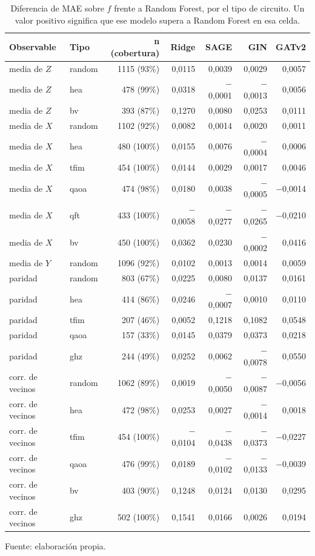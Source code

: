 \begin{table}[htbp]
    \centering
    {\footnotesize
    \begin{tabular}{@{}llrrrrr@{}}
        \toprule
        \textbf{Observable} & \textbf{Tipo} & \textbf{n (cobertura)} & \textbf{Ridge} & \textbf{SAGE} & \textbf{GIN} & \textbf{GATv2} \\
        \midrule
        media de $Z$ & random & 1115 (93\%) & 0,0115 & 0,0039 & 0,0029 & 0,0057 \\
        media de $Z$ & hea & 478 (99\%) & 0,0318 & $-$0,0001 & $-$0,0013 & 0,0056 \\
        media de $Z$ & bv & 393 (87\%) & 0,1270 & 0,0080 & 0,0253 & 0,0111 \\
        media de $X$ & random & 1102 (92\%) & 0,0082 & 0,0014 & 0,0020 & 0,0011 \\
        media de $X$ & hea & 480 (100\%) & 0,0155 & 0,0076 & $-$0,0004 & 0,0006 \\
        media de $X$ & tfim & 454 (100\%) & 0,0144 & 0,0029 & 0,0017 & 0,0046 \\
        media de $X$ & qaoa & 474 (98\%) & 0,0180 & 0,0038 & $-$0,0005 & $-$0,0014 \\
        media de $X$ & qft & 433 (100\%) & $-$0,0058 & $-$0,0277 & $-$0,0265 & $-$0,0210 \\
        media de $X$ & bv & 450 (100\%) & 0,0362 & 0,0230 & $-$0,0002 & 0,0416 \\
        media de $Y$ & random & 1096 (92\%) & 0,0102 & 0,0013 & 0,0014 & 0,0059 \\
        paridad & random & 803 (67\%) & 0,0225 & 0,0080 & 0,0137 & 0,0161 \\
        paridad & hea & 414 (86\%) & 0,0246 & $-$0,0007 & 0,0010 & 0,0110 \\
        paridad & tfim & 207 (46\%) & 0,0052 & 0,1218 & 0,1082 & 0,0548 \\
        paridad & qaoa & 157 (33\%) & 0,0145 & 0,0379 & 0,0373 & 0,0218 \\
        paridad & ghz & 244 (49\%) & 0,0252 & 0,0062 & $-$0,0078 & 0,0550 \\
        corr. de vecinos & random & 1062 (89\%) & 0,0019 & $-$0,0050 & $-$0,0087 & $-$0,0056 \\
        corr. de vecinos & hea & 472 (98\%) & 0,0253 & 0,0027 & $-$0,0014 & 0,0018 \\
        corr. de vecinos & tfim & 454 (100\%) & $-$0,0104 & $-$0,0438 & $-$0,0373 & $-$0,0227 \\
        corr. de vecinos & qaoa & 476 (99\%) & 0,0189 & $-$0,0102 & $-$0,0133 & $-$0,0039 \\
        corr. de vecinos & bv & 403 (90\%) & 0,1248 & 0,0124 & 0,0130 & 0,0295 \\
        corr. de vecinos & ghz & 502 (100\%) & 0,1541 & 0,0166 & 0,0026 & 0,0194 \\
        \bottomrule
    \end{tabular}}

    \caption{Diferencia de MAE sobre $f$ frente a Random Forest, por el tipo de circuito. Un valor positivo significa que ese modelo supera a Random Forest en esa celda.}
    \label{tab:v3_tipo_mae_dif}

    {\footnotesize Fuente: elaboración propia.}
\end{table}
